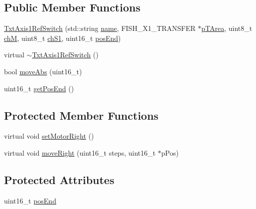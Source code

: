 \subsection*{Public Member Functions}
\begin{DoxyCompactItemize}
\item 
\hyperlink{classft_1_1_txt_axis1_ref_switch_ac609b45e7b39e1807268780d6693019b}{Txt\+Axis1\+Ref\+Switch} (std\+::string \hyperlink{classft_1_1_txt_axis_a358af2b2ed1709b40ab6c9768c2795ef}{name}, F\+I\+S\+H\+\_\+\+X1\+\_\+\+T\+R\+A\+N\+S\+F\+ER $\ast$\hyperlink{classft_1_1_txt_axis_ae5521c2eda7b80599ed6340f6a8192f2}{p\+T\+Area}, uint8\+\_\+t \hyperlink{classft_1_1_txt_axis_a3a8988acb2f578fe96312221205c50c4}{chM}, uint8\+\_\+t \hyperlink{classft_1_1_txt_axis_a9b155580a8dcc876c8e0c4b9c92041e7}{ch\+S1}, uint16\+\_\+t \hyperlink{classft_1_1_txt_axis1_ref_switch_a8b9bda2c9ff12ef5f1355d630136e48b}{pos\+End})
\item 
virtual \hyperlink{classft_1_1_txt_axis1_ref_switch_a908594d73ac8b51867b3e2e21616f2be}{$\sim$\+Txt\+Axis1\+Ref\+Switch} ()
\item 
bool \hyperlink{classft_1_1_txt_axis1_ref_switch_a631984bd9524721f1338e1196a2510e5}{move\+Abs} (uint16\+\_\+t)
\item 
uint16\+\_\+t \hyperlink{classft_1_1_txt_axis1_ref_switch_aac2e9702b89ffb55fefad69bb24274c2}{get\+Pos\+End} ()
\end{DoxyCompactItemize}
\subsection*{Protected Member Functions}
\begin{DoxyCompactItemize}
\item 
virtual void \hyperlink{classft_1_1_txt_axis1_ref_switch_afbdf212009e8b29b67e01af18d708607}{set\+Motor\+Right} ()
\item 
virtual void \hyperlink{classft_1_1_txt_axis1_ref_switch_aef61418eee7beff5c8823d867188ad3b}{move\+Right} (uint16\+\_\+t steps, uint16\+\_\+t $\ast$p\+Pos)
\end{DoxyCompactItemize}
\subsection*{Protected Attributes}
\begin{DoxyCompactItemize}
\item 
uint16\+\_\+t \hyperlink{classft_1_1_txt_axis1_ref_switch_a8b9bda2c9ff12ef5f1355d630136e48b}{pos\+End}
\end{DoxyCompactItemize}
